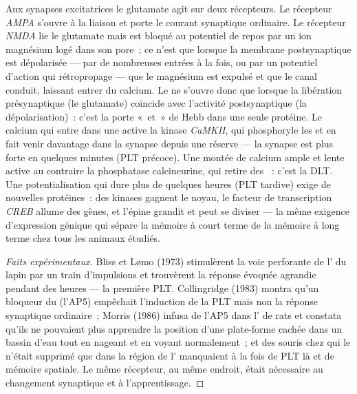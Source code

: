 \begin{proposition}\label{prop:b3:learning-memory:nmda}
Aux synapses excitatrices le glutamate agit sur deux récepteurs. Le
récepteur \emph{AMPA} s'ouvre à la liaison et porte le courant
synaptique ordinaire. Le récepteur \emph{NMDA} lie le glutamate mais est
bloqué au potentiel de repos par un ion magnésium logé dans son pore~;
ce n'est que lorsque la membrane postsynaptique est dépolarisée --- par
de nombreuses entrées à la fois, ou par un potentiel d'action qui
rétropropage --- que le magnésium est expulsé et que le canal conduit,
laissant entrer du calcium. Le  ne s'ouvre donc que
lorsque la libération présynaptique (le glutamate) coïncide avec
l'activité postsynaptique (la dépolarisation)~: c'est la porte «~et~» de
Hebb dans une seule protéine. Le calcium qui entre dans une \emph{} active la kinase \emph{CaMKII}, qui phosphoryle les
 et en fait venir davantage dans la synapse depuis une
réserve --- la synapse est plus forte en quelques minutes (PLT précoce).
Une montée de calcium ample et lente active au contraire la phosphatase
calcineurine, qui retire des ~: c'est la DLT. Une
potentialisation qui dure plus de quelques heures (PLT tardive) exige de
nouvelles protéines~: des kinases gagnent le noyau, le facteur de
transcription \emph{CREB} allume des gènes, et l'épine grandit et peut
se diviser --- la même exigence d'expression génique qui sépare la
mémoire à court terme de la mémoire à long terme chez tous les animaux
étudiés.
\end{proposition}

\begin{proof}[Faits expérimentaux]
Bliss et L\o mo (1973) stimulèrent la voie perforante de l' du
lapin par un train d'impulsions et trouvèrent la réponse évoquée
agrandie pendant des heures --- la première PLT. Collingridge (1983)
montra qu'un bloqueur du  (l'AP5) empêchait l'induction de
la PLT mais non la réponse synaptique ordinaire~; Morris (1986) infusa
de l'AP5 dans l' de rats et constata qu'ils ne pouvaient plus
apprendre la position d'une plate-forme cachée dans un bassin d'eau
tout en nageant et en voyant normalement~; et des souris chez qui le
 n'était supprimé que dans la région  de l'
manquaient à la fois de PLT là et de mémoire spatiale. Le même
récepteur, au même endroit, était nécessaire au changement synaptique et
à l'apprentissage.
\end{proof}

